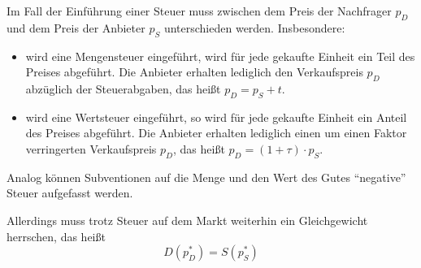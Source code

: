 Im Fall der Einführung einer Steuer muss zwischen dem Preis der Nachfrager $p_D$ und dem Preis der Anbieter $p_S$ unterschieden werden. Insbesondere:
\begin{itemize}
	\item wird eine Mengensteuer eingeführt, wird für jede gekaufte Einheit ein Teil des Preises abgeführt. Die Anbieter erhalten lediglich den Verkaufspreis $p_D$ abzüglich der Steuerabgaben, das heißt $p_D = p_S + t$.
	\item wird eine Wertsteuer eingeführt, so wird für jede gekaufte Einheit ein  Anteil des Preises abgeführt. Die Anbieter erhalten lediglich einen um einen Faktor verringerten Verkaufspreis $p_D$, das heißt $p_D = (1 + \tau) \cdot p_S$.
\end{itemize} 
Analog können Subventionen auf die Menge und den Wert des Gutes \enquote{negative} Steuer aufgefasst werden. ~\bigskip

Allerdings muss trotz Steuer auf dem Markt weiterhin ein Gleichgewicht herrschen, das heißt
\begin{equation*}
	D(p^*_D) = S(p^*_S) \tag*{$(*)$}
\end{equation*} 

